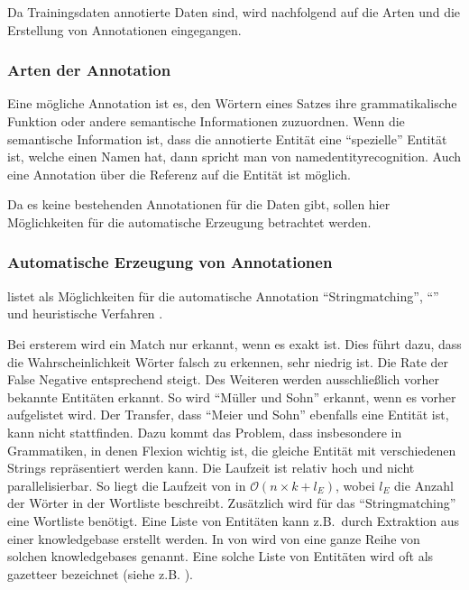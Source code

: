 Da Trainingsdaten annotierte Daten sind,
wird nachfolgend auf die Arten und die Erstellung von Annotationen eingegangen.

\subsubsection{Arten der Annotation}

Eine mögliche Annotation ist es,
den Wörtern eines Satzes ihre grammatikalische Funktion
oder andere semantische Informationen
zuzuordnen.
Wenn die semantische Information ist,
dass die annotierte Entität eine \enquote{spezielle} Entität ist,
welche einen Namen hat,
dann spricht man von \gls{namedentityrecognition}.
Auch eine Annotation über die Referenz auf die Entität ist möglich.

Da es keine bestehenden Annotationen für die Daten gibt,
sollen hier Möglichkeiten für die automatische Erzeugung betrachtet werden.

\subsubsection{Automatische Erzeugung von Annotationen}

\citeauthor{2006.15509} listet als Möglichkeiten für die automatische Annotation
\enquote{Stringmatching}, \enquote{} und heuristische Verfahren
\autocite{2006.15509}.

Bei ersterem wird ein Match nur erkannt,
wenn es exakt ist.
Dies führt dazu,
dass die Wahrscheinlichkeit Wörter falsch zu erkennen,
sehr niedrig ist.
Die Rate der False Negative entsprechend steigt.
Des Weiteren werden ausschließlich vorher bekannte Entitäten erkannt.
So wird \enquote{Müller und Sohn} erkannt,
wenn es vorher aufgelistet wird.
Der Transfer,
dass \enquote{Meier und Sohn} ebenfalls eine Entität ist,
kann nicht stattfinden.
Dazu kommt das Problem,
dass insbesondere in Grammatiken,
in denen Flexion
wichtig ist,
die gleiche Entität mit verschiedenen Strings repräsentiert werden kann.
Die Laufzeit ist relativ hoch und nicht parallelisierbar.
So liegt die Laufzeit von 
in \(\mathcal{O}\left( n \times k + l_E \right)\),
wobei \(l_E\) die Anzahl der Wörter in der Wortliste beschreibt.
Zusätzlich wird für das \enquote{Stringmatching} eine Wortliste benötigt.
Eine Liste von Entitäten kann
z.B.\, durch Extraktion aus einer \gls{knowledgebase}
erstellt werden.
In \autocite[A.1]{2006.15509} von 
wird von \citeauthor{2006.15509} eine ganze Reihe von solchen \glspl{knowledgebase}
genannt.
Eine solche Liste von Entitäten wird oft als \gls{gazetteer} bezeichnet
(siehe z.B. \autocite[Introduction]{Carlson2009}).

